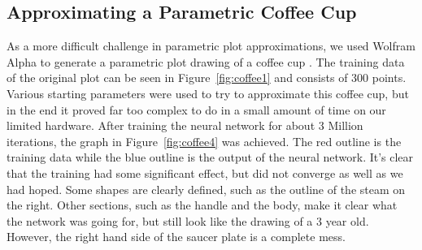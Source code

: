 \documentclass{article}
\begin{document}
\begin{multicols}{2}
\section{Approximating a Parametric Coffee Cup}

As a more difficult challenge in parametric plot approximations, we used Wolfram Alpha to generate a parametric plot drawing of a coffee cup \cite{wolfram}. The training data of the original plot can be seen in Figure~\ref{fig:coffee1} and consists of 300 points. Various starting parameters were used to try to approximate this coffee cup, but in the end it proved far too complex to do in a small amount of time on our limited hardware. After training the neural network for about 3 Million iterations, the graph in Figure~\ref{fig:coffee4} was achieved. The red outline is the training data while the blue outline is the output of the neural network. It's clear that the training had some significant effect, but did not converge as well as we had hoped. Some shapes are clearly defined, such as the outline of the steam on the right. Other sections, such as the handle and the body, make it clear what the network was going for, but still look like the drawing of a 3 year old. However, the right hand side of the saucer plate is a complete mess.





\end{multicols}
\end{document}
